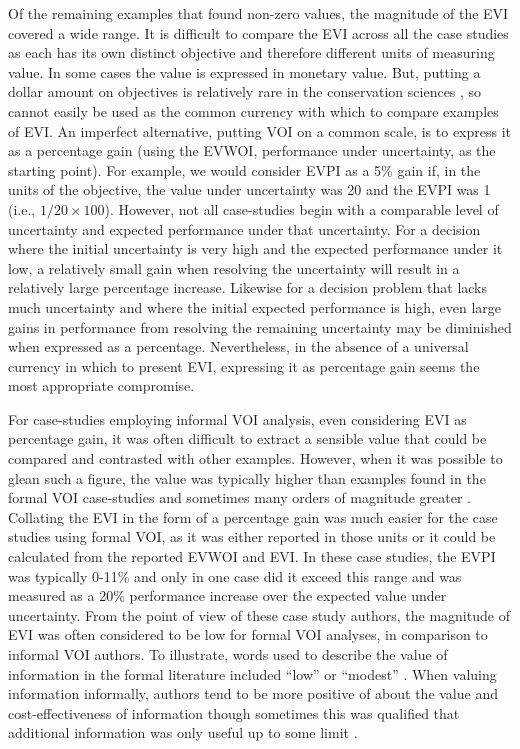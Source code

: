 \documentclass[]{article}
\theoremstyle{definition}
\theoremstyle{definition}
\theoremstyle{definition}
\theoremstyle{remark}
\begin{document}
Of the remaining examples that found non-zero values, the magnitude of
the EVI covered a wide range. It is difficult to compare the EVI across
all the case studies as each has its own distinct objective and
therefore different units of measuring value. In some cases the value is
expressed in monetary value. But, putting a dollar amount on objectives
is relatively rare in the conservation sciences \citep{Edwards1998}, so
cannot easily be used as the common currency with which to compare
examples of EVI. An imperfect alternative, putting VOI on a common
scale, is to express it as a percentage gain (using the EVWOI,
performance under uncertainty, as the starting point). For example, we
would consider EVPI as a 5\% gain if, in the units of the objective, the
value under uncertainty was 20 and the EVPI was 1 (i.e.,
\(1/20 \times 100\)). However, not all case-studies begin with a
comparable level of uncertainty and expected performance under that
uncertainty. For a decision where the initial uncertainty is very high
and the expected performance under it low, a relatively small gain when
resolving the uncertainty will result in a relatively large percentage
increase. Likewise for a decision problem that lacks much uncertainty
and where the initial expected performance is high, even large gains in
performance from resolving the remaining uncertainty may be diminished
when expressed as a percentage. Nevertheless, in the absence of a
universal currency in which to present EVI, expressing it as percentage
gain seems the most appropriate compromise.

For case-studies employing informal VOI analysis, even considering EVI
as percentage gain, it was often difficult to extract a sensible value
that could be compared and contrasted with other examples. However, when
it was possible to glean such a figure, the value was typically higher
than examples found in the formal VOI case-studies and sometimes many
orders of magnitude greater
\citep[e.g.,][]{Stoms2011, Hermoso2013, Runting2013}. Collating the EVI
in the form of a percentage gain was much easier for the case studies
using formal VOI, as it was either reported in those units
\citep[e.g.,][]{Costello2010, Moore2011} or it could be calculated from
the reported EVWOI and EVI. In these case studies, the EVPI was
typically 0-11\% and only in one case \citep{Runge2011a} did it exceed
this range and was measured as a 20\% performance increase over the
expected value under uncertainty. From the point of view of these case
study authors, the magnitude of EVI was often considered to be low for
formal VOI analyses, in comparison to informal VOI authors. To
illustrate, words used to describe the value of information in the
formal literature included ``low''
\citep[e.g.,][]{Johnson2014a, Johnson2014b, Maxwell2015} or ``modest''
\citep[e.g.,][]{Moore2011}. When valuing information informally, authors
tend to be more positive of about the value and cost-effectiveness of
information though sometimes this was qualified that additional
information was only useful up to some limit
\citep[\citet{Grantham2009}]{Grantham2008}.
\end{document}
